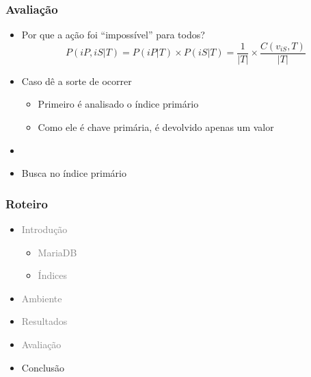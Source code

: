 \documentclass[10pt]{beamer}
\begin{document}
\begin{frame}[fragile]
  \frametitle{Avaliação}

  \begin{itemize}

    \item Por que a ação foi ``impossível'' para todos?
    \begin{equation}
    P(iP, iS | T) = P(iP | T) \times P(iS | T) = \frac{1}{|T|} \times \frac{C(v_{iS}, T)}{|T|} \nonumber
    \end{equation}


    \item Caso dê a sorte de ocorrer
      \begin{itemize}
        \item[-] Primeiro é analisado o índice primário
        \item[-] Como ele é chave primária, é devolvido apenas um valor
      \end{itemize}

    \item[\ ] \ 

    \item Busca no índice primário

  \end{itemize}


\end{frame}




\begin{frame}
  \frametitle{Roteiro}

  \begin{itemize}

    \item[\color{gray}{$\bullet$}] \textcolor{gray}{Introdução}
    
    \begin{itemize}
      \item[\ ] \textcolor{gray}{MariaDB}
      \item[\ ] \textcolor{gray}{Índices}
    \end{itemize}


    \item[\color{gray}{$\bullet$}] \textcolor{gray}{Ambiente}

    \item[\color{gray}{$\bullet$}] \textcolor{gray}{Resultados}

    \item[\color{gray}{$\bullet$}] \textcolor{gray}{Avaliação}

    \item Conclusão

  \end{itemize}

\end{frame}
\end{document}

